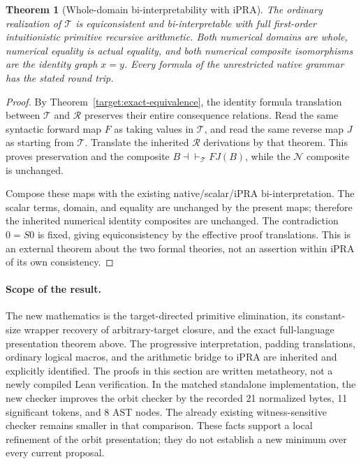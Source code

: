 \documentclass[11pt,a4paper]{article}
\newtheorem{theorem}{Theorem}[section]
\theoremstyle{definition}\newtheorem{definition}[theorem]{Definition}
\begin{document}
\begin{theorem}[Whole-domain bi-interpretability with iPRA]
\label{target:biinterpretation}
The ordinary realization of $\mathcal T$ is equiconsistent and
bi-interpretable with full first-order intuitionistic primitive recursive
arithmetic.  Both numerical domains are whole, numerical equality is actual
equality, and both numerical composite isomorphisms are the identity graph
$x=y$.  Every formula of the unrestricted native grammar has the stated
round trip.
\end{theorem}
\begin{proof}
By Theorem~\ref{target:exact-equivalence}, the identity formula translation
between $\mathcal T$ and $\mathcal R$ preserves their entire consequence
relations.  Read the same syntactic forward map $F$ as taking values in
$\mathcal T$, and read the same reverse map $J$ as starting from
$\mathcal T$.  Translate the inherited $\mathcal R$ derivations by that
theorem.  This proves preservation and the composite
$B\dashv\vdash_{\mathcal T}FJ(B)$, while the $\mathcal N$ composite is
unchanged.

Compose these maps with the existing native/scalar/iPRA bi-interpretation.\cite{bridge}
The scalar terms, domain, and equality are unchanged by the present maps;
therefore the inherited numerical identity composites are unchanged.
The contradiction $0=S0$ is fixed, giving equiconsistency by the effective
proof translations.  This is an external theorem about the two formal
theories, not an assertion within iPRA of its own consistency.
\end{proof}

\paragraph{Scope of the result.}
The new mathematics is the target-directed primitive elimination,
its constant-size wrapper recovery of arbitrary-target closure, and the
exact full-language presentation theorem above.  The progressive
interpretation, padding translations, ordinary logical macros, and the
arithmetic bridge to iPRA are inherited and explicitly identified.
The proofs in this section are written metatheory, not a newly compiled
Lean verification.  In the matched standalone implementation, the new
checker improves the orbit checker by the recorded 21 normalized bytes,
11 significant tokens, and 8 AST nodes.  The already existing
witness-sensitive checker remains smaller in that comparison.  These facts
support a local refinement of the orbit presentation; they do not establish
a new minimum over every current proposal.
\end{document}
